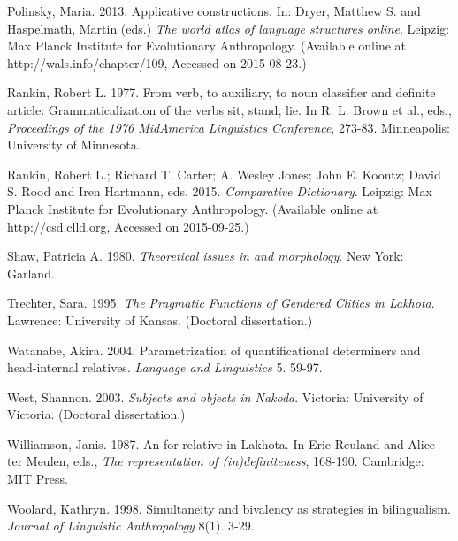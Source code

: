 \begin{refsection}
\begin{reflist}
Polinsky, Maria. 2013. Applicative constructions. In: Dryer, Matthew S. and Haspelmath, Martin (eds.) \textit{The world atlas of language structures online}. Leipzig: Max Planck Institute for Evolutionary Anthropology. (Available online at http://wals.info/chapter/109, Accessed on 2015-08-23.)

Rankin, Robert L. 1977. From verb, to auxiliary, to noun classifier and definite article: Grammaticalization of the  verbs sit, stand, lie. In R. L. Brown et al., eds., \textit{Proceedings of the 1976 MidAmerica Linguistics Conference}, 273-83. Minneapolis: University of Minnesota.  

Rankin, Robert L.; Richard T. Carter; A. Wesley Jones; John E. Koontz; David S. Rood and Iren Hartmann, eds. 2015. \textit{Comparative  Dictionary}. Leipzig: Max Planck Institute for Evolutionary Anthropology. (Available online at http://csd.clld.org, Accessed on 2015-09-25.) 

Shaw, Patricia A. 1980. \textit{Theoretical issues in   and morphology}. New York: Garland.

Trechter, Sara. 1995. \textit{The Pragmatic Functions of Gendered Clitics in Lakhota}. Lawrence: University of Kansas. (Doctoral dissertation.) 

Watanabe, Akira. 2004. Parametrization of quantificational determiners and head-internal relatives. \textit{Language and Linguistics} 5. 59-97.

West, Shannon. 2003. \textit{Subjects and objects in  Nakoda}. Victoria: University of Victoria. (Doctoral dissertation.)

Williamson, Janis. 1987. An  for relative  in Lakhota. In Eric Reuland and Alice ter Meulen, eds., \textit{The representation of (in)definiteness}, 168-190. Cambridge: MIT Press. 

Woolard, Kathryn. 1998. Simultaneity and bivalency as strategies in bilingualism. \textit{Journal of Linguistic Anthropology} 8(1). 3-29.


\end{reflist}

%

\end{refsection}

